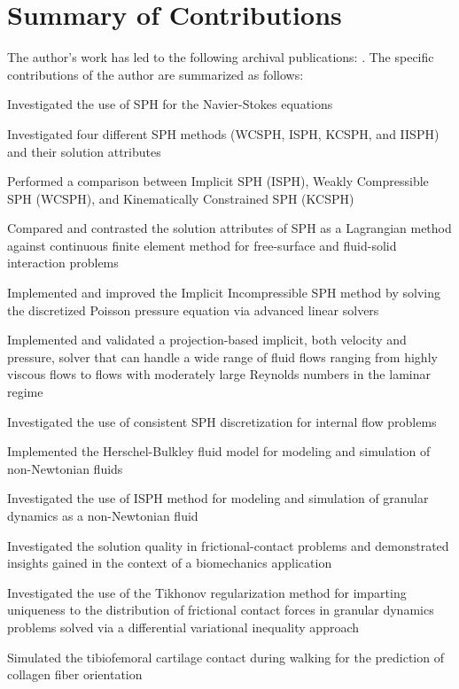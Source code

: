 \section{Summary of Contributions}
\label{sec:contributions}
The author's work has led to the following archival publications: \cite{miladSPHcomparison2019,lagrangianVSeulerian2019,miladHalfImplicit2018,rakhsha2019simulation,hammadConstrFluid2018,weiWenxiaoDanMultiresolution2017,miladASME2017}. The specific contributions of the author are summarized as follows:
\begin{compactitem} 
	\item Investigated the use of SPH for the Navier-Stokes equations
	\begin{compactitem} 
		\item Investigated four different SPH methods (WCSPH, ISPH, KCSPH, and IISPH) and  their solution attributes
		\item Performed a comparison between Implicit SPH (ISPH), Weakly Compressible SPH (WCSPH), and Kinematically Constrained SPH (KCSPH)
		\item Compared and contrasted the solution attributes of SPH as a Lagrangian method against continuous finite element method for free-surface and fluid-solid interaction problems 
		\item Implemented and improved the Implicit Incompressible SPH \cite{ihmsen2014implicit} method by solving the discretized Poisson pressure equation via advanced linear solvers
		\item Implemented and validated a projection-based implicit, both velocity and pressure, solver that can handle a wide range of fluid flows ranging from highly viscous flows to flows with moderately large Reynolds numbers in the laminar regime
		\item Investigated the use of consistent SPH discretization for internal flow problems
		\item Implemented the Herschel-Bulkley fluid model for modeling and simulation of non-Newtonian fluids
		\item Investigated the use of ISPH method for modeling and simulation of granular dynamics as a non-Newtonian fluid 
	\end{compactitem}
	

	\item Investigated the solution quality in frictional-contact problems and demonstrated insights gained in the context of a biomechanics application 
		\begin{compactitem} 
		\item  Investigated the use of the Tikhonov regularization method for imparting uniqueness to the distribution of frictional contact forces in granular dynamics problems solved via a differential variational inequality approach
		\item Simulated the tibiofemoral cartilage contact during walking for the prediction of collagen fiber orientation
	\end{compactitem}


\end{compactitem}
